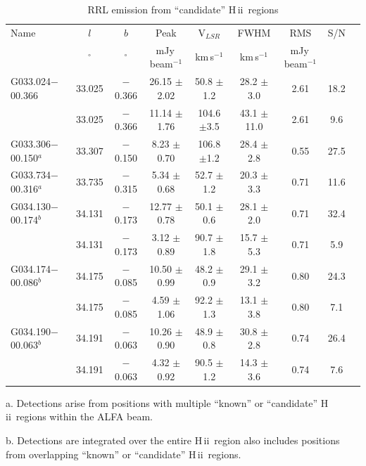 \documentclass[manuscript]{aastex61}
\newcommand{\hii}{{\rm H\,}{{\sc ii}}}
\begin{document}
\begin{table}[htbp]
\centering
\caption{RRL emission from ``candidate'' \hii\ regions }\label{tab_hii_c_sample}
\begin{threeparttable}
\begin{tabular*}{\textwidth}{l@{\extracolsep{\fill}}*{8}{c}}
\hline
\hline
Name & $l$ & $b$ & Peak& V$_{LSR}$& FWHM& RMS& S/N\\
&$^\circ$&$^\circ$&mJy\,beam$^{-1}$&km\,s$^{-1}$&km\,s$^{-1}$&mJy\,beam$^{-1}$& \\
\hline
G033.024$-$00.366     &33.025&$-$0.366&26.15	$\pm$2.02&50.8	$\pm$1.2	&28.2	$\pm$3.0	&2.61	&18.2\\
                      &33.025&$-$0.366&11.14	$\pm$1.76&104.6	$\pm$3.5	&43.1	$\pm$11.0	&2.61	&9.6\\
G033.306$-$00.150$^a$ &33.307&$-$0.150&8.23	$\pm$0.70&106.8	$\pm$1.2	&28.4	$\pm$2.8	&0.55	&27.5\\
G033.734$-$00.316$^a$ &33.735&$-$0.315&5.34	$\pm$0.68&52.7	$\pm$1.2	&20.3	$\pm$3.3	&0.71	&11.6\\
G034.130$-$00.174$^b$ &34.131&$-$0.173&12.77	$\pm$0.78&50.1	$\pm$0.6	&28.1	$\pm$2.0	&0.71	&32.4\\
                      &34.131&$-$0.173&3.12	$\pm$0.89&90.7	$\pm$1.8	&15.7	$\pm$5.3	&0.71	&5.9\\
G034.174$-$00.086$^b$ &34.175&$-$0.085&10.50	$\pm$0.99&48.2	$\pm$0.9	&29.1	$\pm$3.2	&0.80	&24.3\\
                      &34.175&$-$0.085&4.59	$\pm$1.06&92.2	$\pm$1.3	&13.1	$\pm$3.8	&0.80	&7.1\\
G034.190$-$00.063$^b$ &34.191&$-$0.063&10.26	$\pm$0.90&48.9	$\pm$0.8	&30.8	$\pm$2.8	&0.74	&26.4\\
                      &34.191&$-$0.063&4.32	$\pm$0.92&90.5	$\pm$1.2	&14.3	$\pm$3.6	&0.74	&7.6\\
\hline
\end{tabular*}
\begin{tablenotes}
      \small
      \item a. Detections arise from positions with multiple ``known'' or ``candidate'' \hii\ regions within the ALFA beam.
      \item b. Detections are integrated over the entire \hii\ region also includes positions from overlapping ``known'' or ``candidate'' \hii\ regions.
\end{tablenotes}
\end{threeparttable}
\end{table}
\end{document}
